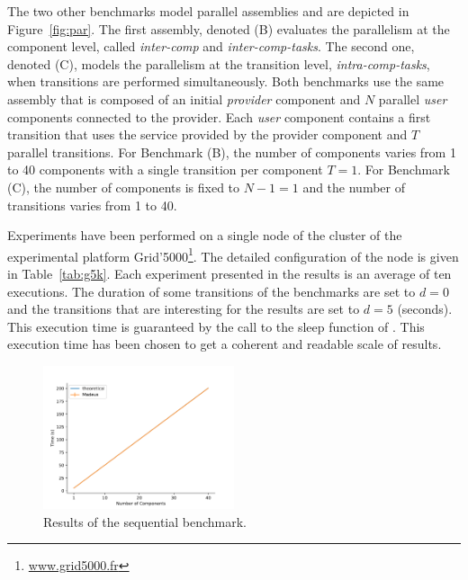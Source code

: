 The two other benchmarks model \mad parallel assemblies and are
depicted in Figure~\ref{fig:par}. The first assembly, denoted (B)
evaluates the parallelism at the component level, called
\emph{inter-comp} and \emph{inter-comp-tasks}. The second one, denoted
(C), models the parallelism at the transition level, \ie
\emph{intra-comp-tasks}, when transitions are performed
simultaneously.
%
Both benchmarks use the same assembly that is composed of an initial
\emph{provider} component and $N$ parallel \emph{user} components
connected to the provider. Each \emph{user} component contains a first
transition that uses the service provided by the provider component
and $T$ parallel transitions. For Benchmark (B), the number of
components varies from 1 to 40 components with a single transition per
component $T=1$. For Benchmark (C), the number of components is fixed
to $N-1=1$ and the number of transitions varies from 1 to 40.

Experiments have been performed on a single node of the \ecotype
cluster of the experimental platform
Grid'5000\footnote{\url{www.grid5000.fr}}. The detailed configuration
of the node is given in Table~\ref{tab:g5k}. Each experiment presented
in the results is an average of ten executions. The duration of some
transitions of the benchmarks are set to $d=0$ and the transitions
that are interesting for the results are set to $d=5$ (seconds). This
execution time is guaranteed by the call to the sleep function of
\python. This execution time has been chosen to get a coherent and
readable scale of results.

\begin{figure}[h]
  \begin{center} 
    \includegraphics[width=0.5\textwidth]{./images/evaluations_sequential.pdf}
    \caption{Results of the sequential benchmark.}
    \label{fig:seqres}
  \end{center}
\end{figure}

